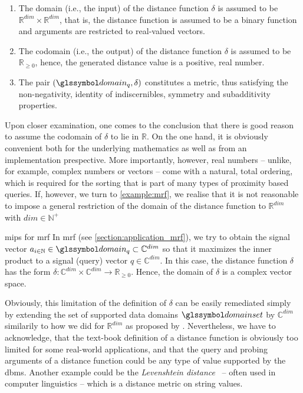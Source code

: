 \begin{enumerate}
    \item The domain (i.e., the input) of the distance function $\delta$ is assumed to be $\mathbb{R}^{dim} \times \mathbb{R}^{dim}$, that is, the distance function is assumed to be a binary function and arguments are restricted to real-valued vectors.
    \item The codomain (i.e., the output) of the distance function $\delta$ is assumed to be $\mathbb{R}_{\geq 0}$, hence, the generated distance value is a positive, real number.
    \item The pair $(\domain_q,\delta)$ constitutes a metric, thus satisfying the non-negativity, identity of indiscernibles, symmetry and subadditivity properties.
\end{enumerate}

Upon closer examination, one comes to the conclusion that there is good reason to assume the codomain of $\delta$ to lie in $\mathbb{R}$. On the one hand, it is obviously convenient both for the underlying mathematics as well as from an implementation prespective. More importantly, however, real numbers -- unlike, for example, complex numbers or vectors -- come with a natural, total ordering, which is required for the sorting that is part of many types of proximity based queries. If, however, we turn to \cref{example:mrf}, we realise that it is not reasonable to impose a general restriction of the domain of the distance function to $\mathbb{R}^{dim}$ with $dim \in \mathbb{N^{+}}$

\begin{example}[label=example:mrf]{\acrlong{mips}{} for \acrshort{mrf}}{}
    In \acrshort{mrf} (see \cref{section:application_mrf}), we try to obtain the signal vector $a_{i \in \mathbb{N}} \in \domain_q \subset \mathbb{C}^{dim}$ so that it maximizes the inner product to a signal (query) vector $q \in \mathbb{C}^{dim}$. In this case, the distance function $\delta$ has the form $\delta \colon \mathbb{C}^{dim} \times \mathbb{C}^{dim} \to \mathbb{R}_{\geq 0}$. Hence, the domain of $\delta$ is a complex vector space.
\end{example}

Obviously, this limitation of the definition of $\delta$ can be easily remediated simply by extending the set of supported data domains $\domainset$ by $\mathbb{C}^{dim}$ similarily to how we did for $\mathbb{R}^{dim}$ as proposed by \cite{Giangreco:2018thesis}. Nevertheless, we have to acknowledge, that the text-book definition of a distance function is obviously too limited for some real-world applications, and that the query and probing arguments of a distance function could be any type of value supported by the \acrshort{dbms}. Another example could be the \emph{Levenshtein distance}~\cite{Levensthtein:1965Binary} -- often used in computer linguistics -- which is a distance metric on string values.

